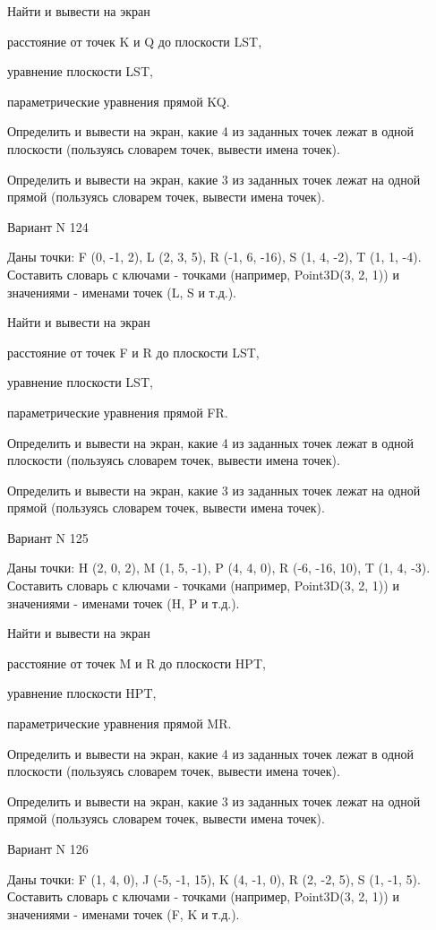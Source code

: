 \documentclass[11pt]{report}
\begin{document}
 
Найти и вывести на экран


расстояние от точек K и Q до плоскости LST,

 
уравнение плоскости LST,

 
параметрические уравнения прямой KQ.


Определить и вывести на экран, какие 4 из заданных точек лежат в одной плоскости (пользуясь словарем точек, вывести имена точек).


Определить и вывести на экран, какие 3 из заданных точек лежат на одной прямой (пользуясь словарем точек, вывести имена точек).

Вариант N 124

Даны точки: F (0, -1, 2), L (2, 3, 5), R (-1, 6, -16), S (1, 4, -2), T (1, 1, -4).
Составить словарь с ключами - точками (например, Point3D(3, 2, 1)) и значениями - именами точек (L, S и т.д.).

 
Найти и вывести на экран


расстояние от точек F и R до плоскости LST,

 
уравнение плоскости LST,

 
параметрические уравнения прямой FR.


Определить и вывести на экран, какие 4 из заданных точек лежат в одной плоскости (пользуясь словарем точек, вывести имена точек).


Определить и вывести на экран, какие 3 из заданных точек лежат на одной прямой (пользуясь словарем точек, вывести имена точек).

Вариант N 125

Даны точки: H (2, 0, 2), M (1, 5, -1), P (4, 4, 0), R (-6, -16, 10), T (1, 4, -3).
Составить словарь с ключами - точками (например, Point3D(3, 2, 1)) и значениями - именами точек (H, P и т.д.).

 
Найти и вывести на экран


расстояние от точек M и R до плоскости HPT,

 
уравнение плоскости HPT,

 
параметрические уравнения прямой MR.


Определить и вывести на экран, какие 4 из заданных точек лежат в одной плоскости (пользуясь словарем точек, вывести имена точек).


Определить и вывести на экран, какие 3 из заданных точек лежат на одной прямой (пользуясь словарем точек, вывести имена точек).

Вариант N 126

Даны точки: F (1, 4, 0), J (-5, -1, 15), K (4, -1, 0), R (2, -2, 5), S (1, -1, 5).
Составить словарь с ключами - точками (например, Point3D(3, 2, 1)) и значениями - именами точек (F, K и т.д.).
\end{document}
